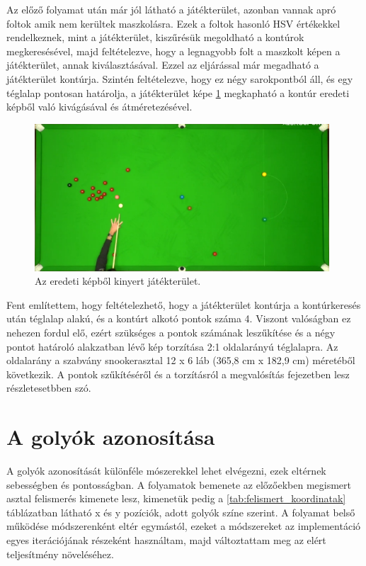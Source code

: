 \par Az előző folyamat után már jól látható a játékterület, azonban vannak apró foltok amik nem kerültek maszkolásra. Ezek a foltok hasonló HSV értékekkel rendelkeznek, mint a játékterület, kiszűrésük megoldható a kontúrok megkeresésével, majd feltételezve, hogy a legnagyobb folt a maszkolt képen a játékterület, annak kiválasztásával. Ezzel az eljárással már megadható a játékterület kontúrja. Szintén feltételezve, hogy ez négy sarokpontból áll, és egy téglalap pontosan határolja, a játékterület képe \ref{fig:bemeneti_asztal2} megkapható a kontúr eredeti képből való kivágásával és átméretezésével.

\begin{figure}[!ht]
    \centering
    \includegraphics[width=110mm, keepaspectratio]{figures/input_table.png}
    \caption{Az eredeti képből kinyert játékterület.}
    \label{fig:bemeneti_asztal2}
\end{figure}

\par Fent említettem, hogy feltételezhető, hogy a játékterület kontúrja a kontúrkeresés után téglalap alakú, és a kontúrt alkotó pontok száma 4. Viszont valóságban ez nehezen fordul elő, ezért szükséges a pontok számának leszűkítése és a négy pontot határoló alakzatban lévő kép torzítása 2:1 oldalarányú téglalapra. Az oldalarány a szabvány snookerasztal 12 x 6 láb (365,8 cm x 182,9 cm)\cite{snooker_rules} méretéből következik. A pontok szűkítéséről és a torzításról a megvalósítás fejezetben lesz részletesetbben szó.

\section{A golyók azonosítása}
A golyók azonosítását különféle mószerekkel lehet elvégezni, ezek eltérnek sebességben és pontosságban. A folyamatok bemenete az előzőekben megismert asztal felismerés kimenete lesz, kimenetük pedig a \ref{tab:felismert_koordinatak} táblázatban látható x és y pozíciók, adott golyók színe szerint. A folyamat belső működése módszerenként eltér egymástól, ezeket a módszereket az implementáció egyes iterációjának részeként használtam, majd változtattam meg az elért teljesítmény növeléséhez.

